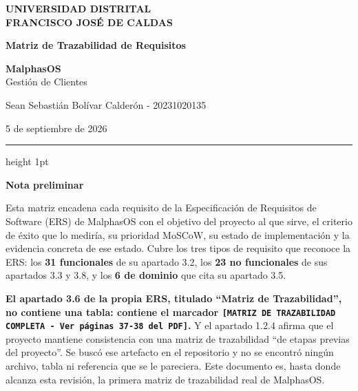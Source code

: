\documentclass[12pt,varwidth=170mm,border=10pt]{standalone}
\newcommand{\sectiontitle}[1]{%
  \par\vspace{1.8ex}%
  {\normalfont\Large\bfseries #1\par}%
  \vspace{1.0ex}%
}
\begin{document}
\begin{center}
  {\Large\textbf{UNIVERSIDAD DISTRITAL}\\
   \textbf{FRANCISCO JOSÉ DE CALDAS}}\par

  \vspace{1.2em}

  {\Huge\textbf{Matriz de Trazabilidad de Requisitos}}\par

  \vspace{1.0em}

  {\Large\textbf{MalphasOS}}\\
  {\large Gestión de Clientes}\par

  \vspace{1.0em}

  {\large Sean Sebastián Bolívar Calderón - 20231020135}\par
  {\large 5 de septiembre de 2026}\par
\end{center}

\vspace{1.0em}
{\color{mainRed}\hrule height 1pt}
\vspace{1.5em}

\sectiontitle{Nota preliminar}

Esta matriz encadena cada requisito de la Especificación de Requisitos de Software (ERS) de MalphasOS con el objetivo del proyecto al que sirve, el criterio de éxito que lo mediría, su prioridad MoSCoW, su estado de implementación y la evidencia concreta de ese estado. Cubre los tres tipos de requisito que reconoce la ERS: los \textbf{31 funcionales} de su apartado 3.2, los \textbf{23 no funcionales} de sus apartados 3.3 y 3.8, y los \textbf{6 de dominio} que cita su apartado 3.5.

\textbf{El apartado 3.6 de la propia ERS, titulado ``Matriz de Trazabilidad'', no contiene una tabla: contiene el marcador \texttt{[MATRIZ DE TRAZABILIDAD COMPLETA - Ver páginas 37-38 del PDF]}.} Y el apartado 1.2.4 afirma que el proyecto mantiene consistencia con una matriz de trazabilidad ``de etapas previas del proyecto''. Se buscó ese artefacto en el repositorio y no se encontró ningún archivo, tabla ni referencia que se le pareciera. Este documento es, hasta donde alcanza esta revisión, la primera matriz de trazabilidad real de MalphasOS.
\end{document}
